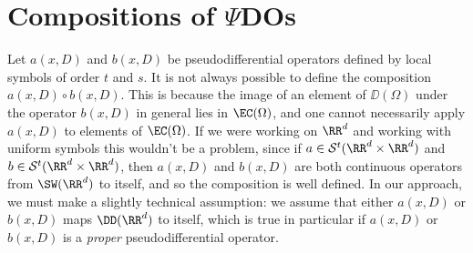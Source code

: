 \begin{comment}
\begin{remark}
    Here, we have worked with symbols satisfying uniform estimates in $x$. But often one can only work with symbols which \emph{locally} satisfy these estimates in $x$, i.e. working in the symbol classes $\loc{\mathcal{S}^t}(\RR^d \times \RR^d)$. The kernels of operators formed from these symbols satisfy bounds of the form
    \[ | \nabla^{n_1}_x \nabla^{n_2}_z K(x,y)| \lesssim_{n_1,n_2,N} \frac{1}{|x-y|^{t + d + n_2 + N}}, \]
    where the implicit constant is \emph{locally uniform} in $x$, and uniform in $y$. On a related note, such operators can be applied to any compactly supported distribution, and satisfy the microlocalization statement $\text{WF}(Tu) \subset \text{WF}(u)$. On the other hand, unless one has a bound such as
    \[ |\nabla_x^{n_1} \nabla_y^{n_2} \nabla_\xi^m a(x,\xi)| \lesssim_{n,m} (\langle x \rangle^{k_{1n}} + \langle y \rangle^{k_{2n}}) \cdot \langle \xi \rangle^{k_{nm}}, \]
    for all $n$ and $m$, it is not necessarily possible to apply the operator to Schwartz functions, and tempered distributions. One can consider asymptotics, as long as we work modulo a weaker family of smoothing operators, i.e. those whose kernels lie in $\EC(\RR^d \times \RR^d)$.
\end{remark}
\end{comment}

\section{Compositions of $\Psi$DOs}

Let $a(x,D)$ and $b(x,D)$ be pseudodifferential operators defined by local symbols of order $t$ and $s$. It is not always possible to define the composition $a(x,D) \circ b(x,D)$. This is because the image of an element of $\DD(\Omega)$ under the operator $b(x,D)$ in general lies in $\EC(\Omega)$, and one cannot necessarily apply $a(x,D)$ to elements of $\EC(\Omega)$. If we were working on $\RR^d$ and working with uniform symbols this wouldn't be a problem, since if $a \in \mathcal{S}^t(\RR^d \times \RR^d)$ and $b \in \mathcal{S}^t(\RR^d \times \RR^d)$, then $a(x,D)$ and $b(x,D)$ are both continuous operators from $\SW(\RR^d)$ to itself, and so the composition is well defined. In our approach, we must make a slightly technical assumption: we assume that either $a(x,D)$ or $b(x,D)$ maps $\DD(\RR^d)$ to itself, which is true in particular if $a(x,D)$ or $b(x,D)$ is a \emph{proper} pseudodifferential operator.

